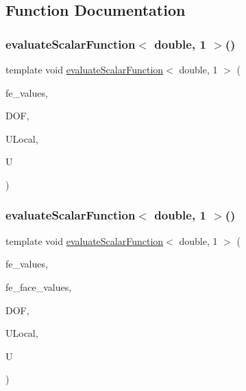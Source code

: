 \subsection{Function Documentation}
\mbox{\label{function_evaluations_8cc_a436a979f117d9baba72821197a739e19}} 
\subsubsection{\texorpdfstring{evaluateScalarFunction$<$ double, 1 $>$()}{evaluateScalarFunction< double, 1 >()}\hspace{0.1cm}{\footnotesize\ttfamily [1/2]}}
{\footnotesize\ttfamily template void \mbox{\hyperlink{group___evaluation_functions_ga2e2fbeb2173113c6889c73bbb7304789}{evaluate\+Scalar\+Function}}$<$ double, 1 $>$ (\begin{DoxyParamCaption}\item[{const F\+E\+Values$<$ 1 $>$ \&}]{fe\+\_\+values,  }\item[{unsigned int}]{D\+OF,  }\item[{Table$<$ 1, double $>$ \&}]{U\+Local,  }\item[{Table$<$ 1, double $>$ \&}]{U }\end{DoxyParamCaption})}

\mbox{\label{function_evaluations_8cc_a1b7c8170a7edbde30679da8b7f16d53b}} 
\subsubsection{\texorpdfstring{evaluateScalarFunction$<$ double, 1 $>$()}{evaluateScalarFunction< double, 1 >()}\hspace{0.1cm}{\footnotesize\ttfamily [2/2]}}
{\footnotesize\ttfamily template void \mbox{\hyperlink{group___evaluation_functions_ga2e2fbeb2173113c6889c73bbb7304789}{evaluate\+Scalar\+Function}}$<$ double, 1 $>$ (\begin{DoxyParamCaption}\item[{const F\+E\+Values$<$ 1 $>$ \&}]{fe\+\_\+values,  }\item[{const F\+E\+Face\+Values$<$ 1 $>$ \&}]{fe\+\_\+face\+\_\+values,  }\item[{unsigned int}]{D\+OF,  }\item[{Table$<$ 1, double $>$ \&}]{U\+Local,  }\item[{Table$<$ 1, double $>$ \&}]{U }\end{DoxyParamCaption})}

